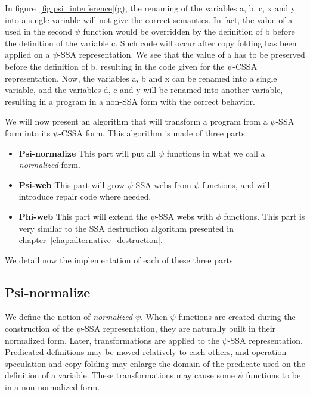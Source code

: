 In figure~\ref{fig:psi_interference}(g), the renaming of the variables
{a}, {b}, {c}, {x} and {y} into a single variable
will not give the correct semantics. In fact, the value of {a}
used in the second $\psi$ function would be overridden by the
definition of {b} before the definition of the variable {
  c}. Such code will occur after copy folding has been applied on a
$\psi$-SSA representation. We see that the value of {a} has to be
preserved before the definition of {b}, resulting in the code
given for the $\psi$-CSSA representation. Now, the variables {a},
{b} and {x} can be renamed into a single variable, and the
variables {d}, {c} and {y} will be renamed into another
variable, resulting in a program in a non-SSA form with the correct
behavior.

We will now present an algorithm that will transform a program from a
$\psi$-SSA form into its $\psi$-CSSA form. This algorithm is made of
three parts.

\begin{itemize}
\item {\bf Psi-normalize} This part will put all $\psi$ functions
in what we call a {\em normalized} form.
\item {\bf Psi-web} This part will grow $\psi$-SSA webs from $\psi$
  functions, and will introduce repair code where needed.
\item {\bf Phi-web} This part will extend the $\psi$-SSA webs with
  $\phi$ functions. This part is very similar to the SSA destruction
  algorithm presented in chapter~\ref{chap:alternative_destruction}.
\end{itemize}

We detail now the implementation of each of these three parts.

\subsection{Psi-normalize}

We define the notion of {\em normalized}-$\psi$. When $\psi$ functions
are created during the construction of the $\psi$-SSA representation,
they are naturally built in their normalized form. Later,
transformations are applied to the $\psi$-SSA representation.
Predicated definitions may be moved relatively to each others, and
operation speculation and copy folding may enlarge the domain of the
predicate used on the definition of a variable. These transformations
may cause some $\psi$ functions to be in a non-normalized form.

